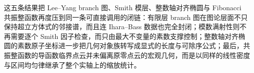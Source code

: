 \noindent
这五条结果把 Lee--Yang branch 图、Smith 模层、整数轴对齐椭圆与 Fibonacci 共振整函数再度压到同一条可直接调用的闭链：有限层 branch 图在图论层面不只保持超立方体式的邻接谱，而且连 Ihara--Bass 数据也完全封闭；模数满射性则不再需要逐个 Smith 因子检查，而只由最大不变量的素数支撑控制；整数轴对齐椭圆的素数原子坐标进一步把几何对象族转写成显式的长度与可除序公式；最后，共振整函数的导函数临界点云并未偏离原零点云的宏观几何，而是以同样的线性密度与区间均匀律继承了整个实轴上的缩放统计。



\endinput
